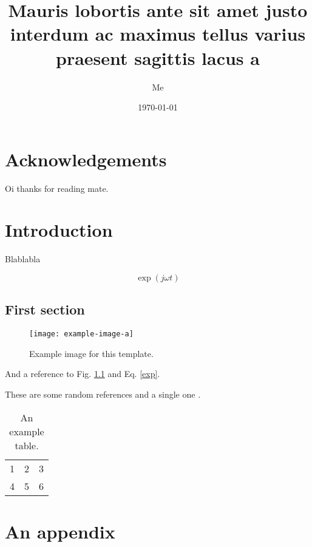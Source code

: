 \documentclass{cpa-thesis}
\title{Mauris lobortis ante sit amet justo interdum ac maximus tellus varius praesent sagittis lacus a}
\author{Me}
\date{\today}
\begin{document}

    \maketitle

    \chapter*{Acknowledgements}

    Oi thanks for reading mate.

    \tableofcontents

    \listoffigures

    \listoftables
    

    \chapter{Introduction}

    Blablabla

    \blindtext[5]

    \begin{equation}
        \exp{(j \omega t)}  \label{exp} 
    \end{equation}

    \section{First section}

    \begin{figure}
        \centering
        \texttt{[image: example-image-a]}
        \caption[Example image]{Example image for this template.}
        \label{example-fig}
    \end{figure}

    \blindtext[5] And a reference to Fig. \ref{example-fig} and Eq. \ref{exp}. 

    These are some random references \cite{einstein,knuth-fa,dirac,knuthwebsite} and a single one \cite{knuth-fa}.

    \begin{table}
        \centering
        \begin{tabular}{ccc}
            1 & 2 & 3 \\
            4 & 5 & 6 \\
            \hline
        \end{tabular}
        \caption[A table]{An example table.}
        \label{example-table}
    \end{table}

    \appendix

    \chapter{An appendix}

    \blindtext

    \printbibliography
\end{document}
